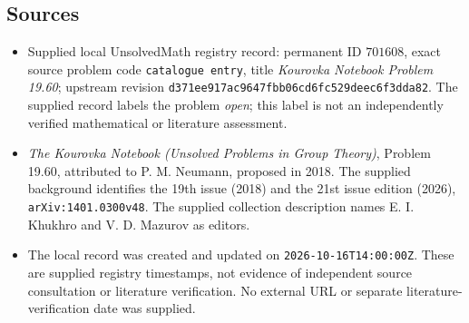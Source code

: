 \documentclass[11pt]{article}
\begin{document}
\subsection{Sources}
\begin{itemize}
\item Supplied local UnsolvedMath registry record: permanent ID \(701608\), exact source problem code \texttt{catalogue entry}, title \emph{Kourovka Notebook Problem 19.60}; upstream revision \texttt{d371ee917ac9647fbb06cd6fc529deec6f3dda82}. The supplied record labels the problem \emph{open}; this label is not an independently verified mathematical or literature assessment.
\item \emph{The Kourovka Notebook (Unsolved Problems in Group Theory)}, Problem 19.60, attributed to P. M. Neumann, proposed in 2018. The supplied background identifies the 19th issue (2018) and the 21st issue edition (2026), \texttt{arXiv:1401.0300v48}. The supplied collection description names E. I. Khukhro and V. D. Mazurov as editors.
\item The local record was created and updated on \texttt{2026-10-16T14:00:00Z}. These are supplied registry timestamps, not evidence of independent source consultation or literature verification. No external URL or separate literature-verification date was supplied.
\end{itemize}
\end{document}

